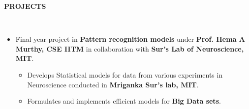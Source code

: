 \documentclass[a4paper,10pt]{article}
\newcommand{\lsep}{-0.5cm}
\newcommand{\resheading}[1]{{\small \colorbox{mygrey}{\begin{minipage}{0.975\textwidth}{\textbf{#1 \vphantom{p\^{E}}}}\end{minipage}}}}
\begin{document}
\resheading{\textbf{PROJECTS} }\\[\lsep]
    \begin{itemize}
        \item Final year project in \textbf{Pattern recognition models} under \textbf{Prof. Hema A Murthy, CSE IITM} in collaboration with \textbf{Sur's Lab of Neuroscience, MIT}.
        \begin{itemize}
            \vspace{-5pt}
            \item Develops Statistical models for data from various experiments in Neuroscience conducted in \textbf{Mriganka Sur's lab, MIT}.
            \item Formulates and implements efficient models for \textbf{Big Data sets}.
        \end{itemize}


\end{itemize}
\end{document}
